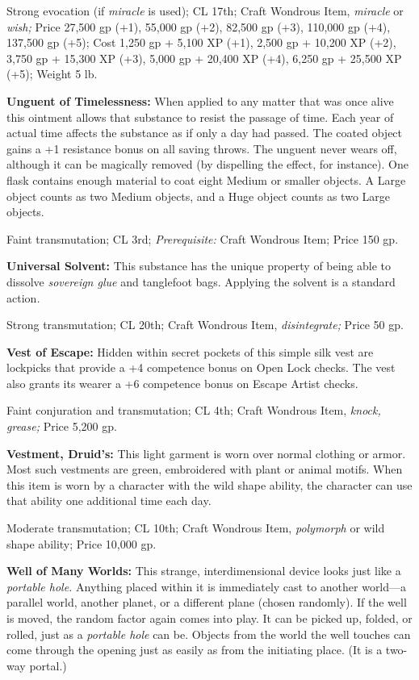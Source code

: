 Strong evocation (if \textit{miracle }is used); CL 17th; Craft Wondrous Item, \textit{miracle 
}or \textit{wish; }Price 27,500 gp (+1), 55,000 gp (+2), 82,500 gp (+3), 110,000 
gp (+4), 137,500 gp (+5); Cost 1,250 gp + 5,100 XP (+1), 2,500 gp + 10,200 XP (+2), 
3,750 gp + 15,300 XP (+3), 5,000 gp + 20,400 XP (+4), 6,250 gp + 25,500 XP (+5); 
Weight 5 lb.

\textbf{Unguent of Timelessness:} When applied to any matter that was once alive 
this ointment allows that substance to resist the passage of time. Each year of 
actual time affects the substance as if only a day had passed. The coated object 
gains a +1 resistance bonus on all saving throws. The unguent never wears off, 
although it can be magically removed (by dispelling the effect, for instance). 
One flask contains enough material to coat eight Medium or smaller objects. A Large 
object counts as two Medium objects, and a Huge object counts as two Large objects.

Faint transmutation; CL 3rd; \textit{Prerequisite: }Craft Wondrous Item; Price 
150 gp.

\textbf{Universal Solvent:} This substance has the unique property of being able 
to dissolve \textit{sovereign glue} and tanglefoot bags. Applying the solvent is 
a standard action\textit{.}

Strong transmutation; CL 20th; Craft Wondrous Item, \textit{disintegrate; }Price 
50 gp.

\textbf{Vest of Escape:} Hidden within secret pockets of this simple silk vest 
are lockpicks that provide a +4 competence bonus on Open Lock checks. The vest 
also grants its wearer a +6 competence bonus on Escape Artist checks.

Faint conjuration and transmutation; CL 4th; Craft Wondrous Item, \textit{knock, 
grease; }Price 5,200 gp.

\textbf{Vestment, Druid's:} This light garment is worn over normal clothing or 
armor. Most such vestments are green, embroidered with plant or animal motifs. 
When this item is worn by a character with the wild shape ability, the character 
can use that ability one additional time each day.

Moderate transmutation; CL 10th; Craft Wondrous Item, \textit{polymorph }or wild 
shape ability; Price 10,000 gp.

\textbf{Well of Many Worlds:} This strange, interdimensional device looks just 
like a \textit{portable hole. }Anything placed within it is immediately cast to 
another world---a parallel world, another planet, or a different plane (chosen 
randomly). If the well is moved, the random factor again comes into play. It can 
be picked up, folded, or rolled, just as a \textit{portable hole }can be. Objects 
from the world the well touches can come through the opening just as easily as 
from the initiating place. (It is a two-way portal.)

